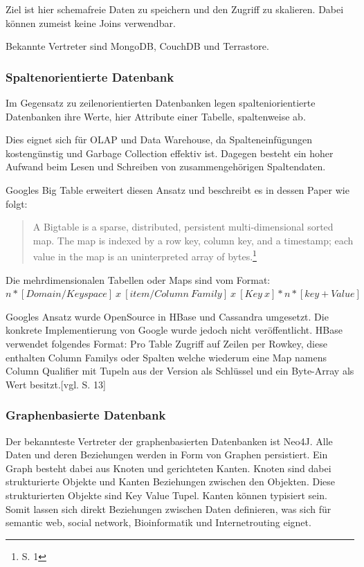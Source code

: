 Ziel ist hier schemafreie Daten zu speichern und den Zugriff zu skalieren.
Dabei können zumeist keine Joins verwendbar.

Bekannte Vertreter sind MongoDB, CouchDB und Terrastore.

\subsubsection{Spaltenorientierte Datenbank}

Im Gegensatz zu zeilenorientierten Datenbanken legen spalteniorientierte Datenbanken ihre Werte, hier Attribute einer Tabelle, spaltenweise ab.

Dies eignet sich für OLAP und Data Warehouse, da Spalteneinfügungen kostengünstig und Garbage Collection effektiv ist.
Dagegen besteht ein hoher Aufwand beim Lesen und Schreiben von zusammengehörigen Spaltendaten.

Googles Big Table erweitert diesen Ansatz und beschreibt es in dessen Paper wie folgt:
\begin{quote}
A  Bigtable  is  a  sparse,  distributed,  persistent  multi-dimensional sorted map. The map is indexed by a row key, column key, and a timestamp; each value in the map is an uninterpreted array of bytes.\footnote{\cite{paper:bigtable} S. 1}
\end{quote}
Die mehrdimensionalen Tabellen oder Maps sind vom Format:\\
$n*[Domain / Keyspace]\ x\ [item / Column\ Family]\ x\ [Key\ x]*n*[key+Value]$

Googles Ansatz wurde OpenSource in HBase und Cassandra umgesetzt. Die konkrete Implementierung von Google wurde jedoch nicht veröffentlicht.
HBase verwendet folgendes Format: Pro Table Zugriff auf Zeilen per Rowkey, diese enthalten Column Familys oder Spalten welche wiederum eine Map namens Column Qualifier mit Tupeln aus der Version als Schlüssel und ein Byte-Array als Wert besitzt.[vgl. \cite{ba:dan} S. 13]

\subsubsection{Graphenbasierte Datenbank}

Der bekannteste Vertreter der graphenbasierten Datenbanken ist Neo4J.
Alle Daten und deren Beziehungen werden in Form von Graphen persistiert.
Ein Graph besteht dabei aus Knoten und gerichteten Kanten.
Knoten sind dabei strukturierte Objekte und Kanten Beziehungen zwischen den Objekten.
Diese strukturierten Objekte sind Key Value Tupel.
Kanten können typisiert sein.
Somit lassen sich direkt Beziehungen zwischen Daten definieren, was sich für semantic web, social network, Bioinformatik und Internetrouting eignet.

